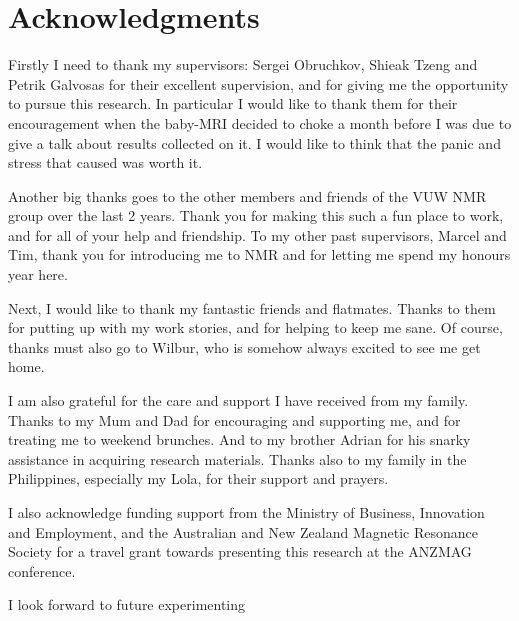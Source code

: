 \chapter*{Acknowledgments}\label{ch:ack}
Firstly I need to thank my supervisors: Sergei Obruchkov, Shieak Tzeng and Petrik Galvosas for their excellent supervision, and for giving me the opportunity to pursue this research.
In particular I would like to thank them for their encouragement when the baby-MRI decided to choke a month before I was due to give a talk about results collected on it.
I would like to think that the panic and stress that caused was worth it.

Another big thanks goes to the other members and friends of the VUW NMR group over the last 2 years.
Thank you for making this such a fun place to work, and for all of your help and friendship.
To my other past supervisors, Marcel and Tim, thank you for introducing me to NMR and for letting me spend my honours year here.

Next, I would like to thank my fantastic friends and flatmates.
Thanks to them for putting up with my work stories, and for helping to keep me sane.
Of course, thanks must also go to Wilbur, who is somehow always excited to see me get home.

I am also grateful for the care and support I have received from my family.
Thanks to my Mum and Dad for encouraging and supporting me, and for treating me to weekend brunches.
And to my brother Adrian for his snarky assistance in acquiring research materials.
Thanks also to my family in the Philippines, especially my Lola, for their support and prayers.

I also acknowledge funding support from the Ministry of Business, Innovation and Employment, and the Australian and New Zealand Magnetic Resonance Society for a travel grant towards presenting this research at the ANZMAG conference.

I look forward to future experimenting

